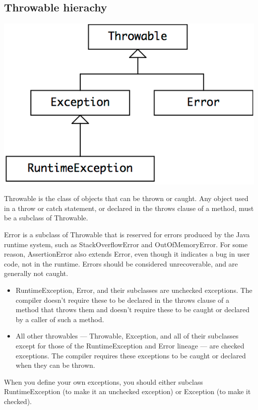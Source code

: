 \documentclass[letterpaper,12pt]{article}
\begin{document}
\subsection{Throwable hierachy}
\includegraphics{./summary_image/Throw_Hierarchy.png}

Throwable is the class of objects that can be thrown or caught. Any object used
in a throw or catch statement, or declared in the throws clause of a method,
must be a subclass of Throwable.

Error is a subclass of Throwable that is reserved for errors produced by the
Java runtime system, such as StackOverflow­Error and OutOfMemory­Error. For
some reason, Assertion­Error also extends Error, even though it indicates a bug
in user code, not in the runtime. Errors should be considered unrecoverable,
and are generally not caught.

\begin{itemize}
      \item RuntimeException, Error, and their subclasses are unchecked exceptions. The
            compiler doesn't require these to be declared in the throws clause of a method
            that throws them and doesn't require these to be caught or declared by a
            caller of such a method.
      \item All other throwables — Throwable, Exception, and all of their subclasses except
            for those of the RuntimeException and Error lineage — are checked exceptions.
            The compiler requires these exceptions to be caught or declared when they can be thrown.
\end{itemize}
When you define your own exceptions, you should either subclass RuntimeException (to make it an unchecked exception) or Exception (to make it checked).
\end{document}

